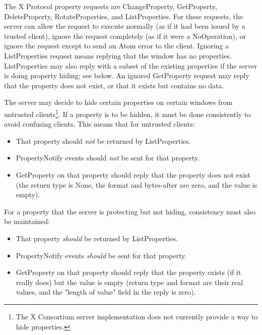 The X Protocol property requests are ChangeProperty, GetProperty,
DeleteProperty, RotateProperties, and ListProperties.  For these
requests, the server can allow the request to execute normally (as if
it had been issued by a trusted client), ignore the request completely
(as if it were a NoOperation), or ignore the request except to send an
Atom error to the client.  Ignoring a ListProperties request means
replying that the window has no properties.  ListProperties may also
reply with a subset of the existing properties if the server is doing
property hiding; see below.  An ignored GetProperty request may reply
that the property does not exist, or that it exists but contains no
data.

The server may decide to hide certain properties on certain windows
from untrusted clients\footnote{The X Consortium server
implementation does not currently provide a way to hide properties.}.
If a property is to be hidden, it must be done consistently to avoid
confusing clients.  This means that for untrusted clients:

\begin{itemize}

\item That property should {\em not} be returned by ListProperties.
\item PropertyNotify events should {\em not} be sent for that property.
\item GetProperty on that property should reply that the property
does not exist (the return type is None, the format and bytes-after
are zero, and the value is empty).

\end{itemize}

For a property that the server is protecting but not hiding,
consistency must also be maintained:

\begin{itemize}

\item That property {\em should} be returned by ListProperties.
\item PropertyNotify events {\em should} be sent for that property.
\item GetProperty on that property should reply that the property
exists (if it really does) but the value is empty (return type and format
are their real values, and the "length of value" field in the reply
is zero).

\end{itemize}

